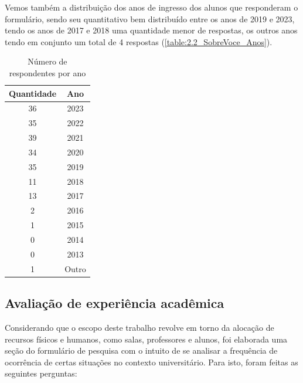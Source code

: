 Vemos também a distribuição dos anos de ingresso dos alunos que responderam o formulário, sendo seu quantitativo bem distribuído entre os anos de 2019 e 2023, tendo os anos de 2017 e 2018 uma quantidade menor de respostas, os outros anos tendo em conjunto um total de 4 respostas (\autoref{table:2.2_SobreVoce_Anos}).

\begin{table}[htbp]\centering
  \caption{Número de respondentes por ano}
  \label{table:2.2_SobreVoce_Anos}
  \begin{tabular}{| c c |}
    \hline
    \textbf{Quantidade} & \textbf{Ano} \\
    \hline
    36                  & 2023         \\
    35                  & 2022         \\
    39                  & 2021         \\
    34                  & 2020         \\
    35                  & 2019         \\
    11                  & 2018         \\
    13                  & 2017         \\
    2                   & 2016         \\
    1                   & 2015         \\
    0                   & 2014         \\
    0                   & 2013         \\
    1                   & Outro        \\
    \hline
  \end{tabular}
\end{table}

\subsection{Avaliação de experiência acadêmica} %

Considerando que o escopo deste trabalho revolve em torno da alocação de recursos físicos e humanos, como salas, professores e alunos, foi elaborada uma seção do formulário de pesquisa com o intuito de se analisar a frequência de ocorrência de certas situações no contexto universitário. Para isto, foram feitas as seguintes perguntas:


